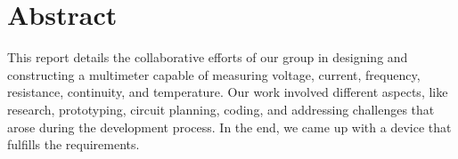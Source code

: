 \section{Abstract}
\label{sec:abstract}
This report details the collaborative efforts of our group in designing and constructing a multimeter capable of measuring voltage, current, frequency, resistance, continuity, and temperature. Our work involved different aspects, like research, prototyping, circuit planning, coding, and addressing challenges that arose during the development process. In the end, we came up with a device that fulfills the requirements.